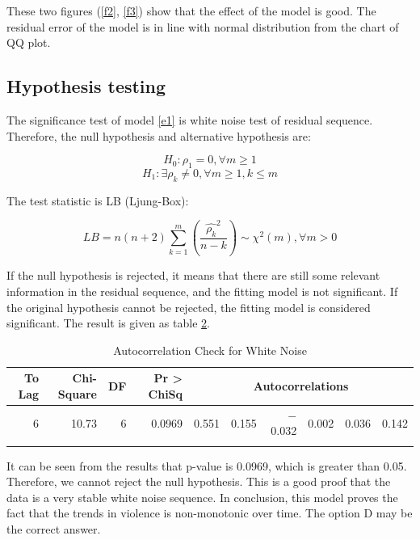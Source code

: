 These two figures (\ref{f2}, \ref{f3}) show that the effect of the model is good. The residual error of the model is in line with normal distribution from the chart of QQ plot.

\subsection*{Hypothesis testing}

The significance test of model \ref{e1} is white noise test of residual sequence. Therefore, the null hypothesis and alternative hypothesis are:

$$H_{0}: \rho_{1} = 0, \forall m \ge 1$$
$$H_{1}: \exists \rho_{k}\neq 0, \forall m \ge 1, k\le m$$

The test statistic is LB (Ljung-Box):

$$LB = n(n + 2) \sum_{k=1}^{m}(\frac{\hat{\rho_{k}}^{2}}{n-k})\sim \chi^{2}(m), \forall m > 0$$

If the null hypothesis is rejected, it means that there are still some relevant information in the residual sequence, and the fitting model is not significant. If the original hypothesis cannot be rejected, the fitting model is considered significant. The result is given as table \ref{tlb}.

\begin{table}[H]
\begin{longtable}{rrrrrrrrrr}
\toprule
   To Lag &    Chi-Square &    DF &    Pr > ChiSq &    \multicolumn{6}{c}{Autocorrelations}\\
  \midrule
\endhead
   6 &    10.73 &    6 &    0.0969 &    0.551 &    0.155 &    $-$0.032 &    0.002 &    0.036 &    0.142\\
\bottomrule
\caption{Autocorrelation Check for White Noise}
\label{tlb}
\end{longtable}
\end{table}

It can be seen from the results that p-value is 0.0969, which is greater than 0.05. Therefore, we cannot reject the null hypothesis. This is a good proof that the data is a very stable white noise sequence. In conclusion, this model proves the fact that the trends in violence is non-monotonic over time. The option D may be the correct answer.

